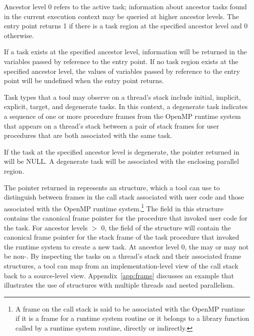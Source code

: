 Ancestor level 0 refers to the active task; information about
ancestor tasks found in the current execution context may be queried at
higher ancestor levels.  The  entry point
returns 1 if there is a task region at the
specified ancestor level and 0 otherwise. 

If a task exists at the specified ancestor level, information
will be returned in the variables passed by reference to the entry
point.  If no task region exists at the specified ancestor level, the
values of variables passed by reference to the entry point will be
undefined when the entry point returns.

Task types that a tool may observe on a thread's stack include 
initial, implicit, explicit, target, and degenerate tasks. 
In this context, 
a degenerate task indicates a sequence of one or more procedure frames 
from the OpenMP runtime system that appears on a thread's stack between
a pair of stack frames for user procedures that are both associated 
with the same task. 

If the task at the specified ancestor level is degenerate, the
pointer returned in  will be NULL.  A degenerate
task will be associated with the enclosing parallel region.  

The pointer returned in  represents an
 structure, which
a tool can use to distinguish between frames in the call stack 
associated with user code and those associated with
the OpenMP runtime system.\footnote{A frame 
on the call stack is said to be associated with 
the OpenMP runtime if it is a frame for a runtime system
routine or it belongs to a library function called by a runtime
system routine, directly or indirectly.} 
The  field in this structure contains the
canonical frame pointer for the procedure that invoked 
user code for the task. 
For ancestor levels $>$ 0, the 
 field of
the structure will contain the canonical frame pointer for the 
stack frame of the task procedure that invoked the runtime system to
create a new task. At ancestor level 0, the  may or
may not be non-. 
By inspecting the tasks on a thread's stack and their associated frame
structures,
a tool can map from an implementation-level view of the call stack
back to a source-level view.
Appendix~\ref{app:frame} discusses an example that
illustrates the use of  structures with multiple
threads and nested parallelism.

